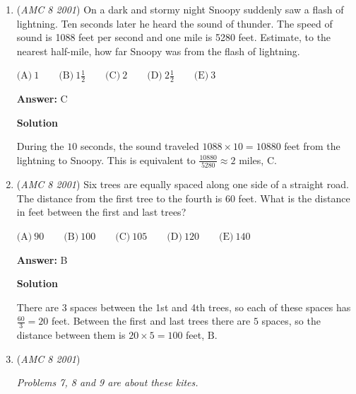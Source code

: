 \begin{enumerate}
 



\textbf{Solution 2 (Faster)}

We know that the smallest possible number is $12349$. However, $12349$ is an odd number. Thus, by shifting the 4 (the largest even number) into the unit's place and rearranging the rest of the digits from least to greatest, we arrive at $12394$. Thus, the digit in the tens place is $\boxed{\text{E}}$ $9$.

 


	\item (\textit{AMC 8 2001}) On a dark and stormy night Snoopy suddenly saw a flash of lightning. Ten seconds later he heard the sound of thunder. The speed of sound is 1088 feet per second and one mile is 5280 feet. Estimate, to the nearest half-mile, how far Snoopy was from the flash of lightning.


 $\text{(A)}\ 1 \qquad \text{(B)}\ 1\frac{1}{2} \qquad \text{(C)}\ 2 \qquad \text{(D)}\ 2\frac{1}{2} \qquad \text{(E)}\ 3$

 \textbf{Answer: }C



\textbf{Solution}

During the $10$ seconds, the sound traveled $1088\times10=10880$ feet from the lightning to Snoopy. This is equivalent to $\frac{10880}{5280}\approx2$ miles, $\boxed{\text{C}}$.

 


	\item (\textit{AMC 8 2001}) Six trees are equally spaced along one side of a straight road. The distance from the first tree to the fourth is 60 feet. What is the distance in feet between the first and last trees?


 $\text{(A)}\ 90 \qquad \text{(B)}\ 100 \qquad \text{(C)}\ 105 \qquad \text{(D)}\ 120 \qquad \text{(E)}\ 140$

 \textbf{Answer: }B



\textbf{Solution}

There are $3$ spaces between the 1st and 4th trees, so each of these spaces has $\frac{60}{3}=20$ feet. Between the first and last trees there are $5$ spaces, so the distance between them is $20\times5=100$ feet, $\boxed{\text{B}}$.

 


	\item (\textit{AMC 8 2001}) 

\textit{Problems 7, 8 and 9 are about these kites.}



\end{enumerate}
